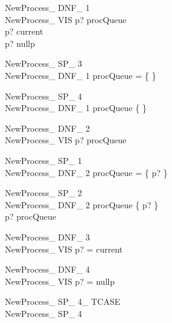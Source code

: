 \documentclass{article}
\begin{document}
\begin{multicols}{2}

\begin{schema}{NewProcess\_ DNF\_ 1}\\
NewProcess\_ VIS 
\where
p? \notin \ran procQueue \\
p? \neq current \\
p? \neq nullp
\end{schema}

\begin{schema}{NewProcess\_ SP\_ 3}\\
NewProcess\_ DNF\_ 1 
\where
\ran procQueue = \{ \}
\end{schema}

\begin{schema}{NewProcess\_ SP\_ 4}\\
NewProcess\_ DNF\_ 1 
\where
\ran procQueue \neq \{ \}
\end{schema}

\begin{schema}{NewProcess\_ DNF\_ 2}\\
NewProcess\_ VIS 
\where
p? \in \ran procQueue
\end{schema}

\begin{schema}{NewProcess\_ SP\_ 1}\\
NewProcess\_ DNF\_ 2 
\where
\ran procQueue = \{ p? \}
\end{schema}

\begin{schema}{NewProcess\_ SP\_ 2}\\
NewProcess\_ DNF\_ 2 
\where
\ran procQueue \neq \{ p? \} \\
p? \in \ran procQueue
\end{schema}

\begin{schema}{NewProcess\_ DNF\_ 3}\\
NewProcess\_ VIS 
\where
p? = current
\end{schema}

\begin{schema}{NewProcess\_ DNF\_ 4}\\
NewProcess\_ VIS 
\where
p? = nullp
\end{schema}

\begin{schema}{NewProcess\_ SP\_ 4\_ TCASE}\\
NewProcess\_ SP\_ 4
\end{schema}


\end{multicols}
\end{document}
